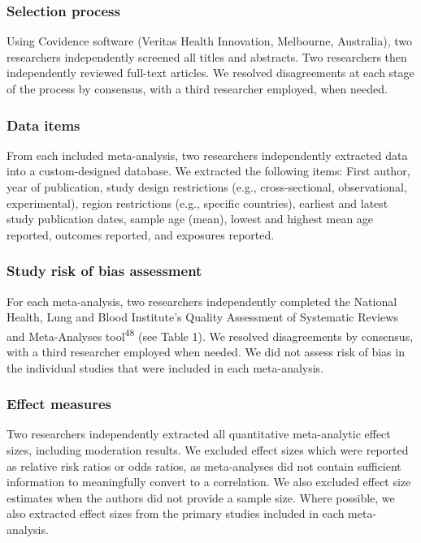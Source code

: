 \documentclass[
  english,
  man]{apa6}
\begin{document}
\hypertarget{selection-process}{%
\subsubsection{Selection process}\label{selection-process}}

Using Covidence software (Veritas Health Innovation, Melbourne, Australia), two researchers independently screened all titles and abstracts.
Two researchers then independently reviewed full-text articles.
We resolved disagreements at each stage of the process by consensus, with a third researcher employed, when needed.

\hypertarget{data-items}{%
\subsubsection{Data items}\label{data-items}}

From each included meta-analysis, two researchers independently extracted data into a custom-designed database.
We extracted the following items: First author, year of publication, study design restrictions (e.g., cross-sectional, observational, experimental), region restrictions (e.g., specific countries), earliest and latest study publication dates, sample age (mean), lowest and highest mean age reported, outcomes reported, and exposures reported.

\hypertarget{study-risk-of-bias-assessment}{%
\subsubsection{Study risk of bias assessment}\label{study-risk-of-bias-assessment}}

For each meta-analysis, two researchers independently completed the National Health, Lung and Blood Institute's Quality Assessment of Systematic Reviews and Meta-Analyses tool\textsuperscript{48} (see Table 1).
We resolved disagreements by consensus, with a third researcher employed when needed.
We did not assess risk of bias in the individual studies that were included in each meta-analysis.

\hypertarget{effect-measures}{%
\subsubsection{Effect measures}\label{effect-measures}}

Two researchers independently extracted all quantitative meta-analytic effect sizes, including moderation results.
We excluded effect sizes which were reported as relative risk ratios or odds ratios, as meta-analyses did not contain sufficient information to meaningfully convert to a correlation.
We also excluded effect size estimates when the authors did not provide a sample size.
Where possible, we also extracted effect sizes from the primary studies included in each meta-analysis.
\end{document}
